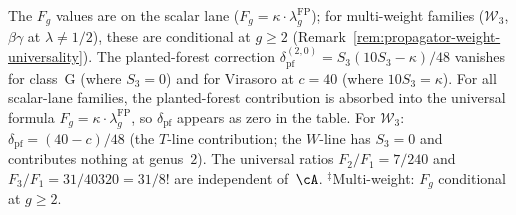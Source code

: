 \begin{remark}
\noindent
The $F_g$ values are on the scalar lane ($F_g = \kappa \cdot \lambda_g^{\mathrm{FP}}$);
for multi-weight families ($\mathcal{W}_3$, $\beta\gamma$ at $\lambda \neq 1/2$),
these are conditional at $g \geq 2$
(Remark~\ref{rem:propagator-weight-universality}).
The planted-forest correction
$\delta_{\mathrm{pf}}^{(2,0)} = S_3(10 S_3 - \kappa)/48$
vanishes for class~G (where $S_3 = 0$) and
for Virasoro at $c = 40$ (where $10 S_3 = \kappa$).
For all scalar-lane families, the planted-forest contribution is
absorbed into the universal formula $F_g = \kappa \cdot \lambda_g^{\mathrm{FP}}$,
so $\delta_{\mathrm{pf}}$ appears as zero in the table.
For $\mathcal{W}_3$: $\delta_{\mathrm{pf}} = (40{-}c)/48$
(the $T$-line contribution; the $W$-line has $S_3 = 0$ and contributes
nothing at genus~$2$).
The universal ratios $F_2/F_1 = 7/240$ and
$F_3/F_1 = 31/40320 = 31/8!$ are independent of~$\cA$.
${}^{\ddagger}$Multi-weight: $F_g$ conditional at $g \geq 2$.
\end{remark}

